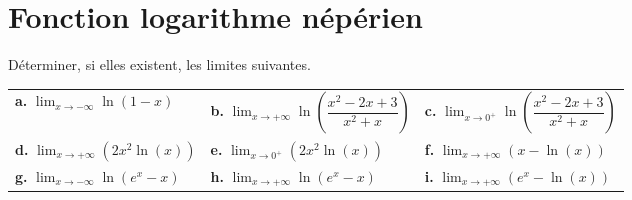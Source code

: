 \documentclass[11pt,fleqn, openany]{book} %
\begin{document}
\section*{Fonction logarithme népérien}


\begin{exercise}Déterminer, si elles existent, les limites suivantes.

\renewcommand{\arraystretch}{2}
\begin{tabularx}{\linewidth}{XXX}
\textbf{a.} $\displaystyle\lim_{x \to -\infty} \ln(1-x)$ & \textbf{b.} $\displaystyle\lim_{x \to +\infty}\ln\left(\dfrac{x^2-2x+3}{x^2+x}\right)$ & \textbf{c.} $\displaystyle\lim_{x \to 0^+}\ln\left(\dfrac{x^2-2x+3}{x^2+x}\right)$ \\
\textbf{d.} $\displaystyle\lim_{x \to +\infty}(2x^2 \ln(x))$ & \textbf{e.} $\displaystyle\lim_{x \to 0^+}(2x^2 \ln(x))$ & \textbf{f.} $\displaystyle\lim_{x \to +\infty}(x-\ln(x))$ \\

\textbf{g.}  $\displaystyle\lim_{x \to -\infty}\ln(e^x-x)$ & \textbf{h.} $\displaystyle\lim_{x \to +\infty}\ln(e^x-x)$ & \textbf{i.} $\displaystyle\lim_{x \to +\infty} (e^x - \ln(x))$
\end{tabularx}
\end{exercise}
\end{document}
